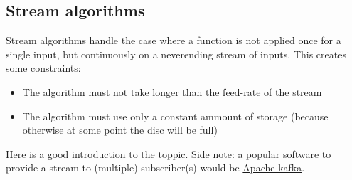 \subsection{Stream algorithms}
Stream algorithms handle the case where a function is not applied once for a single input, but continuously on a neverending stream of inputs. This creates some constraints: 
\begin{itemize}
  \item The algorithm must not take longer than the feed-rate of the stream
  \item The algorithm must use only a constant ammount of storage (because otherwise at some point the disc will be full)
\end{itemize}
\href{https://www.americanscientist.org/article/the-britney-spears-problem}{Here} is a good introduction to the toppic. 
Side note: a popular software to provide a stream to (multiple) subscriber(s) would be \href{https://kafka.apache.org/}{Apache kafka}.